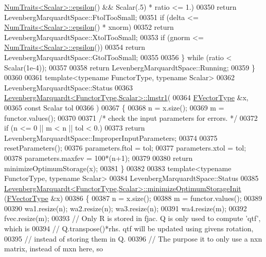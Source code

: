 \begin{DoxyCode}
      \hyperlink{group___core___module_struct_eigen_1_1_num_traits}{NumTraits<Scalar>::epsilon}() && Scalar(.5) * ratio <= 1.)
00350             \textcolor{keywordflow}{return} LevenbergMarquardtSpace::FtolTooSmall;
00351         \textcolor{keywordflow}{if} (delta <= \hyperlink{group___core___module_struct_eigen_1_1_num_traits}{NumTraits<Scalar>::epsilon}() * xnorm)
00352             \textcolor{keywordflow}{return} LevenbergMarquardtSpace::XtolTooSmall;
00353         \textcolor{keywordflow}{if} (gnorm <= \hyperlink{group___core___module_struct_eigen_1_1_num_traits}{NumTraits<Scalar>::epsilon}())
00354             \textcolor{keywordflow}{return} LevenbergMarquardtSpace::GtolTooSmall;
00355 
00356     \} \textcolor{keywordflow}{while} (ratio < Scalar(1e-4));
00357 
00358     \textcolor{keywordflow}{return} LevenbergMarquardtSpace::Running;
00359 \}
00360 
00361 \textcolor{keyword}{template}<\textcolor{keyword}{typename} FunctorType, \textcolor{keyword}{typename} Scalar>
00362 LevenbergMarquardtSpace::Status
00363 \hyperlink{class_eigen_1_1_levenberg_marquardt}{LevenbergMarquardt<FunctorType,Scalar>::lmstr1}(
00364         \hyperlink{group___core___module}{FVectorType}  &x,
00365         \textcolor{keyword}{const} Scalar tol
00366         )
00367 \{
00368     n = x.size();
00369     m = functor.values();
00370 
00371     \textcolor{comment}{/* check the input parameters for errors. */}
00372     \textcolor{keywordflow}{if} (n <= 0 || m < n || tol < 0.)
00373         \textcolor{keywordflow}{return} LevenbergMarquardtSpace::ImproperInputParameters;
00374 
00375     resetParameters();
00376     parameters.ftol = tol;
00377     parameters.xtol = tol;
00378     parameters.maxfev = 100*(n+1);
00379 
00380     \textcolor{keywordflow}{return} minimizeOptimumStorage(x);
00381 \}
00382 
00383 \textcolor{keyword}{template}<\textcolor{keyword}{typename} FunctorType, \textcolor{keyword}{typename} Scalar>
00384 LevenbergMarquardtSpace::Status
00385 \hyperlink{class_eigen_1_1_levenberg_marquardt}{LevenbergMarquardt<FunctorType,Scalar>::minimizeOptimumStorageInit}
      (\hyperlink{group___core___module}{FVectorType}  &x)
00386 \{
00387     n = x.size();
00388     m = functor.values();
00389 
00390     wa1.resize(n); wa2.resize(n); wa3.resize(n);
00391     wa4.resize(m);
00392     fvec.resize(m);
00393     \textcolor{comment}{// Only R is stored in fjac. Q is only used to compute 'qtf', which is}
00394     \textcolor{comment}{// Q.transpose()*rhs. qtf will be updated using givens rotation,}
00395     \textcolor{comment}{// instead of storing them in Q.}
00396     \textcolor{comment}{// The purpose it to only use a nxn matrix, instead of mxn here, so}

\end{DoxyCode}
